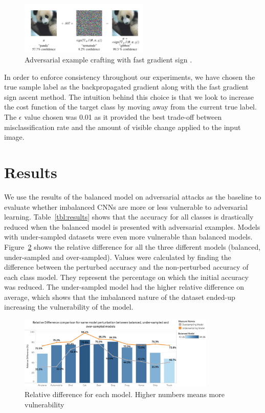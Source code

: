 \documentclass[runningheads,a4paper]{llncs}
\begin{document}
\begin{figure}
	\centering
	\includegraphics[height=2.5cm]{panda.png}
	\caption{Adversarial example crafting with fast gradient sign \cite{goodfellow2014}.}
	\label{fig:fgsm_craft}
\end{figure}

In order to enforce consistency throughout our experiments, we have chosen the true sample label as the backpropagated gradient along with the fast gradient sign ascent method. The intuition behind this choice is that we look to increase the cost function of the target class by moving away from the current true label. The $\epsilon$ value chosen was 0.01 as it provided the best trade-off between misclassification rate and the amount of visible change applied to the input image.


\section{Results}
We use the results of the balanced model on adversarial attacks as the baseline to evaluate whether imbalanced CNNs are more or less vulnerable to adversarial learning. Table~\ref{tbl:results} shows that the accuracy for all classes is drastically reduced when the balanced model is presented with adversarial examples. Models with under-sampled datasets were even more vulnerable than balanced models. Figure~\ref{fig:relative_difference} shows the relative difference for all the three different models (balanced, under-sampled and over-sampled). Values were calculated by finding the difference between the perturbed accuracy and the non-perturbed accuracy of each class model. They represent the percentage on which the initial accuracy was reduced. The under-sampled model had the higher relative difference on average, which shows that the imbalanced nature of the dataset ended-up increasing the vulnerability of the model.

\begin{figure}
	\centering
	\includegraphics[height=3.5cm]{rel_diff_graph.png}
	\caption{Relative difference for each model. Higher numbers means more vulnerability}
	\label{fig:relative_difference}
\end{figure}
\end{document}
